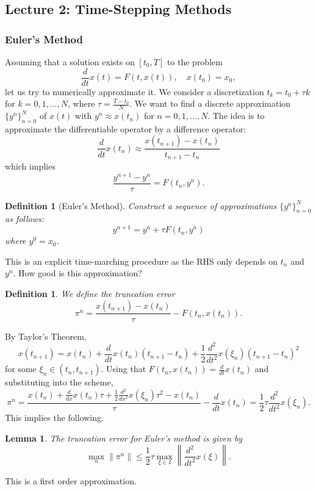 \documentclass{article}
\newtheorem{lemma}[theorem]{Lemma}
\newtheorem{definition}[theorem]{Definition}
\theoremstyle{definition}
\theoremstyle{definition}
\begin{document}
\subsection{Lecture 2: Time-Stepping Methods}
\subsubsection{Euler's Method}
Assuming that a solution exists on $[t_0,T]$ to the problem
$$\frac{d}{dt}x(t)=F(t,x(t)),\quad x(t_0)=x_0,$$
let us try to numerically approximate it. We consider a discretization $t_k=t_0+\tau k$ for $k=0,1,\ldots,N$, where $\tau=\frac{T-t_0}{N}$. We want to find a discrete approximation $\{y^n\}_{n=0}^{N}$ of $x(t)$ with $y^n\approx x(t_n)$ for $n=0,1,\ldots,N$. The idea is to approximate the differentiable operator by a difference operator:
$$\frac{d}{dt}x(t_n)\approx \frac{x(t_{n+1})-x(t_n)}{t_{n+1}-t_n}$$
which implies
$$\frac{y^{n+1}-y^n}{\tau}=F(t_n,y^n).$$
\begin{definition}[Euler's Method]
    Construct a sequence of approximations $\{y^{n}\}_{n=0}^{N}$ as follows:
    $$y^{n+1}=y^{n}+\tau F(t_n,y^n)$$
    where $y^0=x_0$.
\end{definition}
This is an explicit time-marching procedure as the RHS only depends on $t_n$ and $y^n$. How good is this approximation?
\begin{definition}
    We define the truncation error
    $$\pi^n=\frac{x(t_{n+1})-x(t_n)}{\tau}-F(t_n,x(t_n)).$$
\end{definition}
By Taylor's Theorem,
$$x(t_{n+1})=x(t_n)+\frac{d}{dt}x(t_n)(t_{n+1}-t_n)+\frac{1}{2}\frac{d^2}{dt^2}x(\xi_n)(t_{n+1}-t_n)^2$$
for some $\xi_n\in (t_{n},t_{n+1})$. Using that $F(t_n,x(t_n))=\frac{d}{dt}x(t_n)$ and substituting into the scheme,
$$\pi^n=\frac{x(t_n)+\frac{d}{dx}x(t_n)\tau+\frac{1}{2}\frac{d^2}{dx^2}x(\xi_n)\tau^2-x(t_n)}{\tau}-\frac{d}{dt}x(t_n)=\frac{1}{2}\tau \frac{d^2}{dt^2}x(\xi_n).$$
This implies the following.
\begin{lemma}
    The truncation error for Euler's method is given by
    $$\max_{n}\|\pi^n\|\leq \frac{1}{2}\tau \max_{\xi \in I}\left\|\frac{d^2}{dt^2}x(\xi)\right\|.$$
\end{lemma}
This is a first order approximation.
\end{document}
